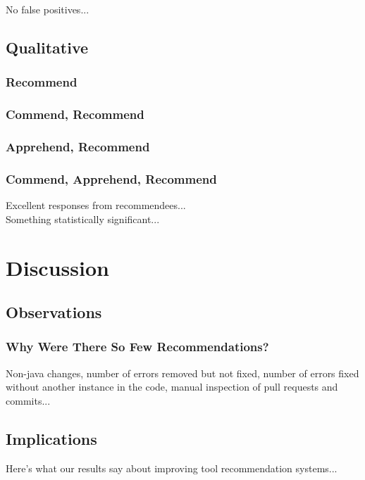 \documentclass[sigconf,review,anonymous]{acmart}
\begin{document}
No false positives...

\subsection{Qualitative}

\subsubsection{Recommend}

\subsubsection{Commend, Recommend}

\subsubsection{Apprehend, Recommend}

\subsubsection{Commend, Apprehend, Recommend}

Excellent responses from recommendees...\\

Something statistically significant...

\section{Discussion}

\subsection{Observations}

\subsubsection{Why Were There So Few Recommendations?}

Non-java changes, number of errors removed but not fixed, number of errors fixed without another instance in the code, manual inspection of pull requests and commits...

\subsection{Implications}

Here's what our results say about improving tool recommendation systems...
\end{document}
